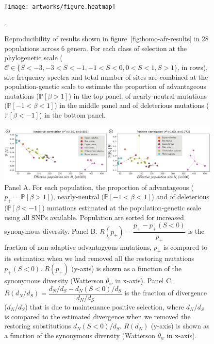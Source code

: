 \documentclass{article}
\newcommand{\proba}{\mathbb{P}}
\newcommand{\dn}{d_N}
\newcommand{\ds}{d_S}
\newcommand{\dnds}{\dn / \ds}
\newcommand{\Sphy}{S}
\newcommand{\Sphyclass}{\mathcal{C}}
\newcommand{\divStrongDel}{\Sphy < -3}
\newcommand{\divDel}{-3 < \Sphy < -1}
\newcommand{\divWeakDel}{-1 < \Sphy < 0}
\newcommand{\divWeakAdv}{0 < \Sphy < 1}
\newcommand{\divAdv}{ \Sphy > 1}
\newcommand{\Spop}{\beta}
\newcommand{\polyDel}{\Spop < -1}
\newcommand{\polyNeutral}{-1 < \Spop < 1}
\newcommand{\polyAdv}{ \Spop > 1}
\newcommand{\PpolyDel}{\proba \left[ \polyDel \right]}
\newcommand{\PpolyNeutral}{\proba \left[ \polyNeutral \right]}
\newcommand{\PpolyAdv}{\proba \left[ \polyAdv \right]}
\begin{document}
    \begin{figure}[!ht]
        \centering
        \texttt{[image: artworks/figure.heatmap]}
        \caption{
            Reproducibility of results shown in figure~\ref{fig:homo-afr-results} in 28 populations across 6 genera.
            For each class of selection at the phylogenetic scale ($\Sphyclass \in \{ \divStrongDel, \divDel,  \divWeakDel,  \divWeakAdv, \divAdv \}$, in rows), site-frequency spectra and total number of sites are combined at the population-genetic scale to estimate the proportion of advantageous mutations ($\PpolyAdv$) in the top panel, of nearly-neutral mutations ($\PpolyNeutral$) in the middle panel and of deleterious mutations ($\PpolyDel$) in the bottom panel.
        }.
        \label{fig:heatmap}
    \end{figure}

    \begin{figure}[!ht]
        \centering
        \includegraphics[width=\textwidth, page=1] {artworks/figure.diversity}
        \caption{
            Panel A. For each population, the proportion of advantageous ($p_+=\PpolyAdv$), nearly-neutral ($\PpolyNeutral$) and of deleterious ($\PpolyDel$) mutations estimated at the population-genetic scale using all SNPs available.
            Population are sorted for increased synonymous diversity.
            Panel B. $R(p_+)=\dfrac{p_+ - p_+(\Sphy < 0)}{p_+}$ is the fraction of non-adaptive advantageous mutations, $p_+$ is compared to its estimation when we had removed all the restoring mutations $p_+(\Sphy < 0)$.
            $R(p_+)$ (y-axis) is shown as a function of the synonymous diversity (Watterson $\theta_w$ in x-axis).
            Panel C. $R(\dnds)=\dfrac{\dnds - \dn(\Sphy < 0) / \ds}{\dnds}$ is the fraction of divergence ($\dnds$) that is due to maintenance positive selection, where $\dnds$ is compared to the estimated divergence when we removed the restoring substitutions $\dn(\Sphy < 0)/\ds$.
            $R(\dn)$ (y-axis) is shown as a function of the synonymous diversity (Watterson $\theta_w$ in x-axis).
        }
        \label{fig:diversity}
    \end{figure}
\end{document}
